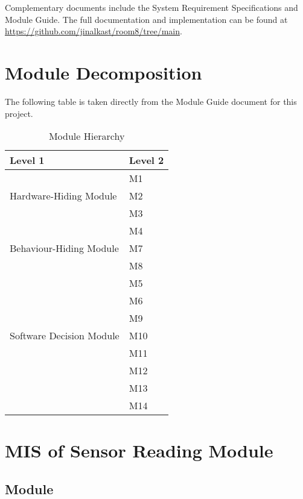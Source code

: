\documentclass[12pt, titlepage]{article}
\begin{document}
Complementary documents include the System Requirement Specifications
and Module Guide.  The full documentation and implementation can be
found at \url{https://github.com/jinalkast/room8/tree/main}.  

\section{Module Decomposition}

The following table is taken directly from the Module Guide document for this project.

\begin{table}[h!]
  \centering
  \begin{tabular}{p{} p{}}
  \toprule
  \textbf{Level 1} & \textbf{Level 2}\\
  \midrule
  \multirow{3}{0.3\textwidth}{Hardware-Hiding Module} 
  & M1 \\
  & M2 \\
  & M3\\
  \midrule
  
  \multirow{3}{0.3\textwidth}{Behaviour-Hiding Module} 
  & M4 \\
  & M7 \\
  & M8 \\
  \midrule
  
  \multirow{7}{0.3\textwidth}{Software Decision Module} 
  & M5\\
  & M6 \\
  & M9\\
  & M10\\
  & M11 \\
  & M12 \\
  & M13 \\
  & M14 \\
  \bottomrule
  
  \end{tabular}
  \caption{Module Hierarchy}
  \label{TblMH}
  \end{table}

\newpage


\section{MIS of Sensor Reading Module} \label{Start} 

\subsection{Module}
\end{document}
